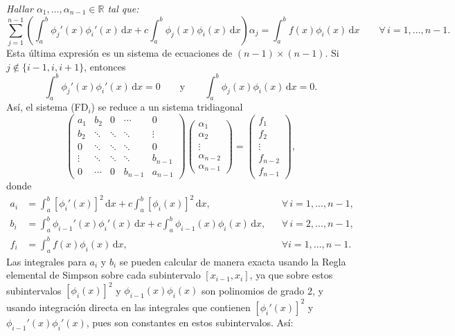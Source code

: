 \documentclass[letterpaper,11pt]{article}
\begin{document}
\emph{Hallar $\alpha_1,\ldots,\alpha_{n-1}\in \mathbb{R}$ tal que:}
\begin{equation*}\tag{FD$_i$}
\sum_{j=1}^{n-1} \left(\int_a^b\phi_j'(x)\phi_i'(x)\,\mathrm{d}x+c\int_a^b \phi_j(x)\phi_i(x)\,\mathrm{d}x\right)\alpha_j=\int_a^b f(x)\phi_i(x)\,\mathrm{d}x \qquad \forall\,i=1,\ldots,n-1.
\end{equation*}
%
Esta \'ultima expresi\'on es un sistema de ecuaciones de $(n-1)\times(n-1)$. Si $j\notin\{i-1,i,i+1\}$, entonces
$$
\int_a^b\phi_j'(x)\phi_i'(x)\,\mathrm{d}x = 0 \qquad \text{y} \qquad \int_a^b\phi_j(x)\phi_i(x)\,\mathrm{d}x = 0.
$$
As\'i, el sistema (FD$_i$) se reduce a un sistema tridiagonal
$$
\begin{pmatrix}
a_1 & b_2 & 0 & \cdots &0\\
b_2 & \ddots & \ddots & \ddots & \vdots\\
0 & \ddots & \ddots & \ddots & 0\\
\vdots & \ddots & \ddots & \ddots & b_{n-1}\\
0 & \cdots & 0 & b_{n-1} & a_{n-1}
\end{pmatrix}
\begin{pmatrix}
\alpha_1\\
\alpha_2\\
\vdots\\
\alpha_{n-2}\\
\alpha_{n-1}
\end{pmatrix}
=
\begin{pmatrix}
f_1\\
f_2\\
\vdots\\
f_{n-2}\\
f_{n-1}
\end{pmatrix},
$$
donde
\begin{align*}
a_i{}&=\int_a^b[\phi_i'(x)]^2\,\mathrm{d}x+c \int_a^b [\phi_i(x)]^2\,\mathrm{d}x,&&\forall\,i=1,\ldots,n-1,\\
b_i{}&=\int_a^b \phi_{i-1}'(x)\phi_i'(x)\,\mathrm{d}x+c\int_a^b \phi_{i-1}(x)\phi_i(x)\,\mathrm{d}x,&&\forall\,i=2,\ldots,n-1,\\
f_i{}&=\int_a^b f(x)\phi_i(x)\,\mathrm{d}x, && \forall i=1,\ldots,n-1.
\end{align*}
Las integrales para $a_i$ y $b_i$ se pueden calcular de manera exacta usando la Regla elemental de Simpson sobre cada subintervalo $[x_{i-1},x_i]$, ya que sobre estos subintervalos $[\phi_i(x)]^2$ y $\phi_{i-1}(x)\phi_i(x)$ son polinomios de grado 2, y usando integraci\'on directa en las integrales que contienen $[\phi_i'(x)]^2$ y $\phi_{i-1}'(x)\phi_i'(x)$, pues son constantes en estos subintervalos. As\'i:
\end{document}
